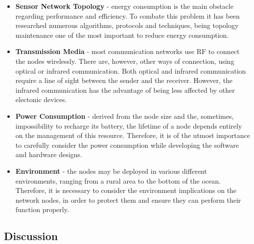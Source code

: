 \begin{itemize}
\begin{figure}[H]
                  \label{fig:sensor_components}
            \end{figure}
      \item \textbf{Sensor Network Topology} - energy consumption is the main obstacle regarding
             performance and efficiency. To combate this problem it has been
            researched numerous algorithms, protocols and techniques, being topology maintenance
            one of the most important to reduce energy consumption.
      \item \textbf{Transmission Media} - most communication networks use \Gls{RF} to connect
            the nodes wirelessly. There are, however, other ways of connection, using optical or
            infrared communication. Both optical and infrared communication require a line of
            sight between the sender and the receiver. However, the infrared communication has
            the advantage of being less affected by other electonic devices.
      \item \textbf{Power Consumption} - derived from the node size and the, sometimes,
            impossibility to recharge its battery, the lifetime of a node depends entirely
            on the management of this resource. Therefore, it is of the utmost importance to
            carefully consider the power consumption while developing the software and hardware
            designs.
      \item \textbf{Environment} - the nodes may be deployed in various different environments,
            ranging from a rural area to the bottom of the ocean. Therefore, it is necessary to
            consider the environment implications on the network nodes, in order to protect them
            and ensure they can perform their function properly.
\end{itemize}


\subsection{Discussion}



